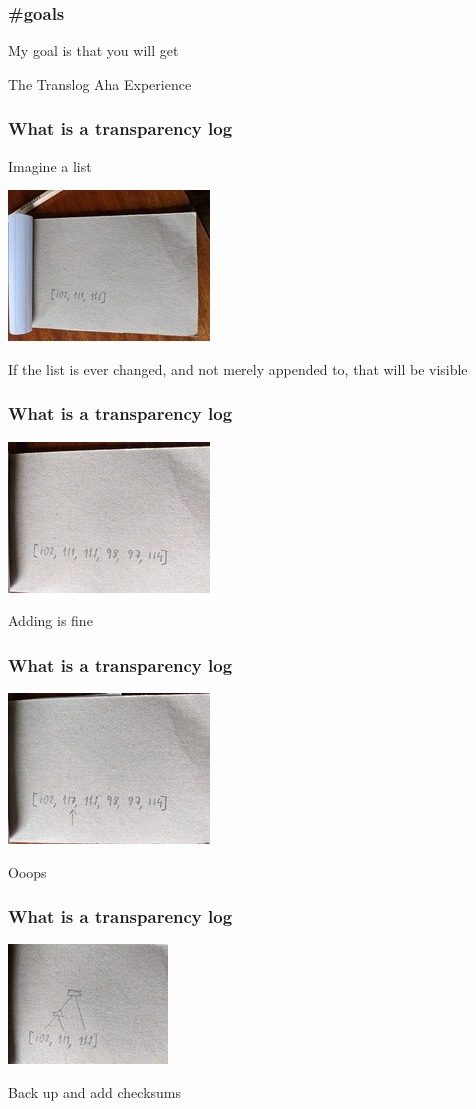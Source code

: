 \begin{frame}
  \frametitle{\#goals}
  \centerline{My goal is that you will get}
  \centerline{The Translog Aha Experience}
\end{frame}

\begin{frame}
  \frametitle{What is a transparency log}
  \centerline{Imagine a list}
  \centerline{\includegraphics{img/list3_s}}
  \pause
  \centerline{If the list is ever changed, and not merely appended to,
    that will be visible}
\end{frame}

\begin{frame}
  \frametitle{What is a transparency log}
  \centerline{\includegraphics{img/list6_s}}
  \centerline{Adding is fine}
\end{frame}

\begin{frame}
  \frametitle{What is a transparency log}
  \centerline{\includegraphics{img/list6mutarrow_s}}
  \centerline{Ooops}
\end{frame}

\begin{frame}
  \frametitle{What is a transparency log}
  \centerline{\includegraphics{img/tree3_s}}
  \centerline{Back up and add checksums}
\end{frame}

